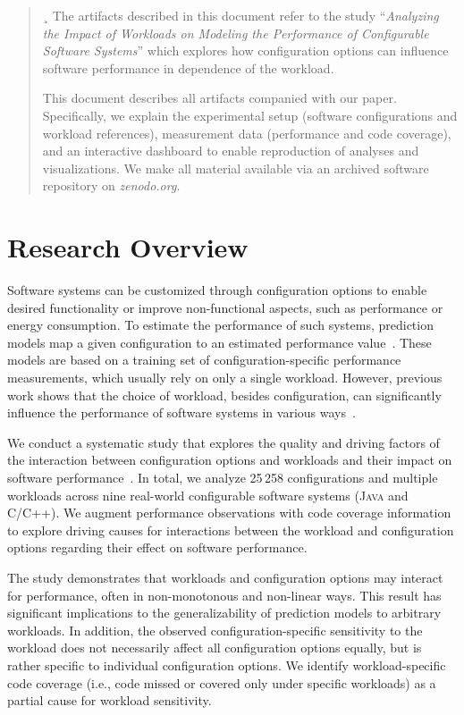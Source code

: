 \begin{abstract}¸
	The artifacts described in this document refer to the study ``\textit{Analyzing the Impact of Workloads on Modeling the Performance of Configurable Software Systems}'' which explores how configuration options can influence software performance in dependence of the workload.
	
	This document describes all artifacts companied with our paper.	
	Specifically, we explain the experimental setup (software configurations and workload references), measurement data (performance and code coverage), and an interactive dashboard to enable reproduction of analyses and visualizations. We make all material available via an archived software repository on \textit{zenodo.org}.
\end{abstract}

\section{Research Overview}
Software systems can be customized through configuration options to enable desired functionality or improve non-functional aspects, such as performance or energy consumption. To estimate the performance of such systems, prediction models map a given configuration to an estimated performance value~\cite{pereira_2021_learning,kaltenecker_interplay_2020}. These models are based on a training set of configuration-specific performance measurements, which usually rely on only a single workload. However, previous work shows that the choice of workload, besides configuration, can significantly influence the performance of software systems in various ways~\cite{alves_sampling_2020,lesoil_2021}.  

We conduct a systematic study that explores the quality and driving factors of the interaction between configuration options and workloads and their impact on software performance~\cite{muhlbauer_workload_2023}. In total, we analyze 25\,258 configurations and multiple workloads across nine real-world configurable software systems (\textsc{Java} and \textsc{C}/\textsc{C++}). We augment performance observations with code coverage information to explore driving causes for interactions between the workload and configuration options regarding their effect on software performance. 

The study demonstrates that workloads and configuration options may interact for performance, often in non-monotonous and non-linear ways. This result has significant implications to the generalizability of prediction models to arbitrary workloads. In addition, the observed configuration-specific sensitivity to the workload does not necessarily affect all configuration options equally, but is rather specific to individual configuration options. We identify workload-specific code coverage (i.e., code missed or covered only under specific workloads) as a partial cause for workload sensitivity.

